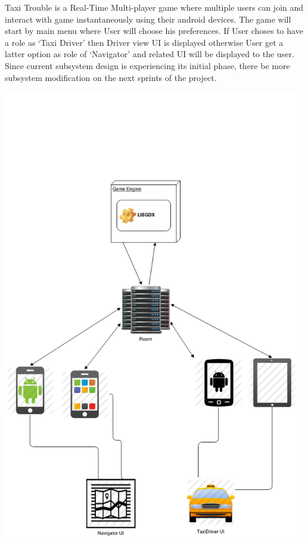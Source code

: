 
Taxi Trouble is a Real-Time Multi-player game where multiple users can join and interact with game instantaneously using their android devices. The game will start by main menu where User will choose his preferences. If User choses to have a role as `Taxi Driver' then Driver view UI is displayed otherwise User get a latter option as role of  `Navigator' and related UI will be displayed to the user. Since current subsystem design is experiencing its initial phase, there be more subsystem modification on the next sprints of the project.\\


\begin{center}
	 \includegraphics[width=130mm]{./images/Sprint2_softhard2.png}
\end{center}